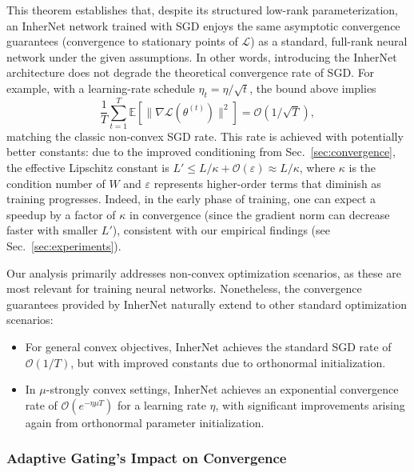 \documentclass{article} %
\begin{document}
This theorem establishes that, despite its structured low-rank parameterization, an InherNet network trained with SGD enjoys the same asymptotic convergence guarantees (convergence to stationary points of $\mathcal{L}$) as a standard, full-rank neural network under the given assumptions. In other words, introducing the InherNet architecture does not degrade the theoretical convergence rate of SGD. For example, with a learning-rate schedule $\eta_t = \eta/\sqrt{t}$, the bound above implies 
\begin{equation}
\frac{1}{T}\sum_{t=1}^T \mathbb{E}[\|\nabla \mathcal{L}(\theta^{(t)})\|^2] = \mathcal{O}(1/\sqrt{T}),
\end{equation}
matching the classic non-convex SGD rate. This rate is achieved with potentially better constants: due to the improved conditioning from Sec.~\ref{sec:convergence}, the effective Lipschitz constant is $L' \leq L/\kappa + \mathcal{O}(\varepsilon) \approx L/\kappa$, where $\kappa$ is the condition number of $W$ and $\varepsilon$ represents higher-order terms that diminish as training progresses. Indeed, in the early phase of training, one can expect a speedup by a factor of $\kappa$ in convergence (since the gradient norm can decrease faster with smaller $L'$), consistent with our empirical findings (see Sec.~\ref{sec:experiments}).

\begin{remark}
Our analysis primarily addresses non-convex optimization scenarios, as these are most relevant for training neural networks. Nonetheless, the convergence guarantees provided by InherNet naturally extend to other standard optimization scenarios:
\begin{itemize}[leftmargin=*, topsep=2pt, itemsep=2pt]
    \item For general convex objectives, InherNet achieves the standard SGD rate of $\mathcal{O}(1/T)$, but with improved constants due to orthonormal initialization.
    \item In $\mu$-strongly convex settings, InherNet achieves an exponential convergence rate of $\mathcal{O}(e^{-\eta\mu T})$ for a learning rate $\eta$, with significant improvements arising again from orthonormal parameter initialization.
\end{itemize}
\end{remark}

\subsubsection{Adaptive Gating's Impact on Convergence}
\end{document}

